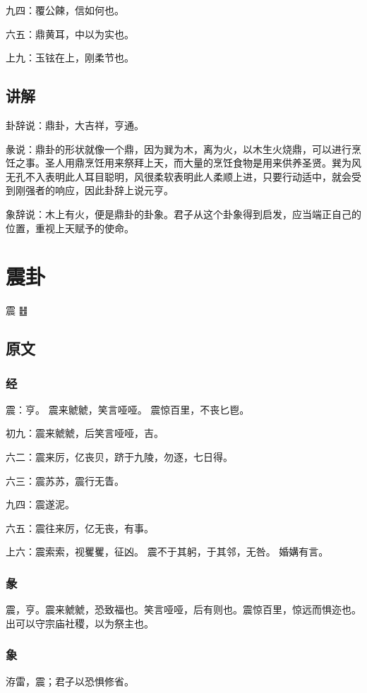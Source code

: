 \documentclass[12pt,oneside]{book}
\begin{document}
九四：覆公餗，信如何也。

六五：鼎黄耳，中以为实也。

上九：玉铉在上，刚柔节也。

\section{讲解}
卦辞说：鼎卦，大吉祥，亨通。

彖说：鼎卦的形状就像一个鼎，因为巽为木，离为火，以木生火烧鼎，可以进行烹饪之事。圣人用鼎烹饪用来祭拜上天，而大量的烹饪食物是用来供养圣贤。巽为风无孔不入表明此人耳目聪明，风很柔软表明此人柔顺上进，只要行动适中，就会受到刚强者的响应，因此卦辞上说元亨。

象辞说：木上有火，便是鼎卦的卦象。君子从这个卦象得到启发，应当端正自己的位置，重视上天赋予的使命。






\chapter{震卦}
震 {\large ䷲}
\section{原文}

\subsection{经}
震：亨。 震来虩虩，笑言哑哑。 震惊百里，不丧匕鬯。

初九：震来虩虩，后笑言哑哑，吉。

六二：震来厉，亿丧贝，跻于九陵，勿逐，七日得。

六三：震苏苏，震行无眚。

九四：震遂泥。

六五：震往来厉，亿无丧，有事。

上六：震索索，视矍矍，征凶。 震不于其躬，于其邻，无咎。 婚媾有言。

\subsection{彖}
震，亨。震来虩虩，恐致福也。笑言哑哑，后有则也。震惊百里，惊远而惧迩也。 出可以守宗庙社稷，以为祭主也。

\subsection{象}
洊雷，震；君子以恐惧修省。
\end{document}
